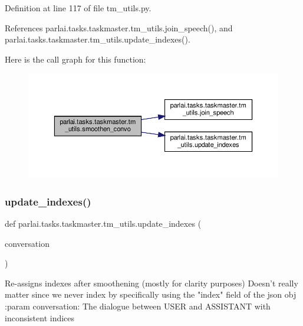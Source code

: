 Definition at line 117 of file tm\+\_\+utils.\+py.



References parlai.\+tasks.\+taskmaster.\+tm\+\_\+utils.\+join\+\_\+speech(), and parlai.\+tasks.\+taskmaster.\+tm\+\_\+utils.\+update\+\_\+indexes().

Here is the call graph for this function\+:
\nopagebreak
\begin{figure}[H]
\begin{center}
\leavevmode
\includegraphics[width=350pt]{namespaceparlai_1_1tasks_1_1taskmaster_1_1tm__utils_ad9cc917cf497b3cd81ccb76a719cf1b7_cgraph}
\end{center}
\end{figure}
\mbox{\label{namespaceparlai_1_1tasks_1_1taskmaster_1_1tm__utils_ad0c8c99eb4b5152ca8cec2a8fe7895fd}} 
\subsubsection{\texorpdfstring{update\+\_\+indexes()}{update\_indexes()}}
{\footnotesize\ttfamily def parlai.\+tasks.\+taskmaster.\+tm\+\_\+utils.\+update\+\_\+indexes (\begin{DoxyParamCaption}\item[{}]{conversation }\end{DoxyParamCaption})}

\begin{DoxyVerb}Re-assigns indexes after smoothening (mostly for clarity purposes)
Doesn't really matter since we never index by specifically using the "index"
field of the json obj
:param conversation:
    The dialogue between USER and ASSISTANT with inconsistent indices
\end{DoxyVerb}
 

